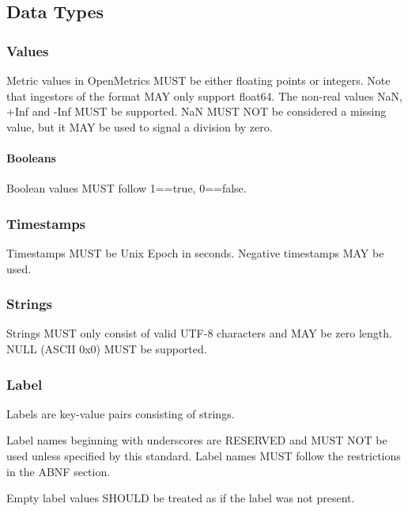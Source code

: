 \documentclass[a4paper,12pt,notitlepage,twoside,openright]{article}
\begin{document}
\hypertarget{data-types}{%
\subsection{Data Types}\label{data-types}}

\hypertarget{values}{%
\subsubsection{Values}\label{values}}

Metric values in OpenMetrics MUST be either floating points or integers.
Note that ingestors of the format MAY only support float64. The non-real
values NaN, +Inf and -Inf MUST be supported. NaN MUST NOT be considered
a missing value, but it MAY be used to signal a division by zero.

\hypertarget{booleans}{%
\paragraph{Booleans}\label{booleans}}

Boolean values MUST follow 1==true, 0==false.

\hypertarget{timestamps}{%
\subsubsection{Timestamps}\label{timestamps}}

Timestamps MUST be Unix Epoch in seconds. Negative timestamps MAY be
used.

\hypertarget{strings}{%
\subsubsection{Strings}\label{strings}}

Strings MUST only consist of valid UTF-8 characters and MAY be zero
length. NULL (ASCII 0x0) MUST be supported.

\hypertarget{label}{%
\subsubsection{Label}\label{label}}

Labels are key-value pairs consisting of strings.

Label names beginning with underscores are RESERVED and MUST NOT be used
unless specified by this standard. Label names MUST follow the
restrictions in the ABNF section.

Empty label values SHOULD be treated as if the label was not present.
\end{document}
